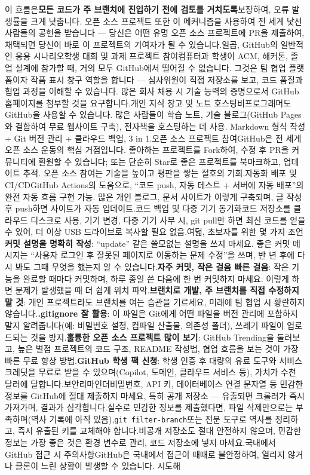 이 흐름은\textbf{모든 코드가 주 브랜치에 진입하기 전에 검토를 거치도록}보장하여, 오류 발생률을 크게 낮춥니다. 오픈 소스 프로젝트 또한 이 메커니즘을 사용하여 전 세계 낯선 사람들의 공헌을 받습니다 — 당신은 어떤 유명 오픈 소스 프로젝트에 PR을 제출하여, 채택되면 당신이 바로 이 프로젝트의 기여자가 될 수 있습니다.일곱, GitHub의 일반적인 응용 시나리오학생 대회 및 과제 프로젝트 참여컴퓨터과 학생이 ACM, 해커톤, 졸업 설계에 참가할 때, 거의 모두 GitHub에서 떨어질 수 없습니다. 그것은 팀 협업 플랫폼이자 작품 표시 창구 역할을 합니다 — 심사위원이 직접 저장소를 보고, 코드 품질과 협업 과정을 이해할 수 있습니다. 많은 회사 채용 시 기술 능력의 증명으로서 GitHub 홈페이지를 첨부할 것을 요구합니다.개인 지식 창고 및 노트 호스팅비프로그래머도 GitHub을 사용할 수 있습니다. 많은 사람들이 학습 노트, 기술 블로그(GitHub Pages와 결합하여 무료 웹사이트 구축), 전자책을 호스팅하는 데 사용. Markdown 형식 작성 + Git 버전 관리 + 클라우드 백업, 3 in 1.오픈 소스 프로젝트 참여GitHub은 전 세계 오픈 소스 운동의 핵심 거점입니다. 좋아하는 프로젝트를 Fork하여, 수정 후 PR을 커뮤니티에 환원할 수 있습니다; 또는 단순히 Star로 좋은 프로젝트를 북마크하고, 업데이트 추적. 오픈 소스 참여는 기술을 높이고 평판을 쌓는 절호의 기회.자동화 배포 및 CI/CDGitHub Actions의 도움으로, “코드 push, 자동 테스트 + 서버에 자동 배포”의 완전 자동 흐름 구현 가능. 많은 개인 블로그, 문서 사이트가 이렇게 구축되며, 글 작성 후 push하면 사이트가 자동 업데이트.코드 백업 및 다중 기기 동기화코드 저장소를 클라우드 디스크로 사용, 기기 변경, 다중 기기 사무 시, git pull만 하면 최신 코드를 얻을 수 있어, 더 이상 USB 드라이브로 복사할 필요 없음.여덟, 초보자를 위한 몇 가지 조언\textbf{커밋 설명을 명확히 작성}: “update” 같은 쓸모없는 설명을 쓰지 마세요. 좋은 커밋 메시지는 “사용자 로그인 후 잘못된 페이지로 이동하는 문제 수정”을 쓰며, 반 년 후에 다시 봐도 그때 무엇을 했는지 알 수 있습니다.\textbf{자주 커밋, 작은 걸음 빠른 걸음}: 작은 기능을 완료할 때마다 커밋하며, 하루 종일 쓴 다음에 한 번 커밋하지 마세요. 이렇게 하면 문제가 발생했을 때 더 쉽게 위치 파악.\textbf{브랜치로 개발, 주 브랜치를 직접 수정하지 말 것}: 개인 프로젝트라도 브랜치를 여는 습관을 기르세요, 미래에 팀 협업 시 황란하지 않습니다.\textbf{.gitignore 잘 활용}: 이 파일은 Git에게 어떤 파일을 버전 관리에 포함하지 말지 알려줍니다(예: 비밀번호 설정, 컴파일 산출물, 의존성 폴더), 쓰레기 파일이 업로드되는 것을 방지.\textbf{훌륭한 오픈 소스 프로젝트 많이 보기}: GitHub Trending을 둘러보고, 높은 별점 프로젝트의 코드 구조, README 작성법, 협업 흐름을 보는 것이 가장 빠른 무료 향상 방법.\textbf{GitHub 학생 팩 신청}: 학생 인증 후 대량의 유료 도구와 서비스 크레딧을 무료로 받을 수 있으며(Copilot, 도메인, 클라우드 서비스 등), 가치가 수천 달러에 달합니다.보안리마인더비밀번호, API 키, 데이터베이스 연결 문자열 등 민감한 정보를 GitHub에 절대 제출하지 마세요, 특히 공개 저장소 — 유출되면 크롤러가 즉시 가져가며, 결과가 심각합니다.실수로 민감한 정보를 제출했다면, 파일 삭제만으로는 부족하며(역사 기록에 아직 있음),\texttt{git filter-\allowbreak branch}또는 전문 도구로 역사를 정리하고, 즉시 유출된 키를 교체해야 합니다.비공개 저장소도 절대 안전하지 않으며, 민감한 정보는 가장 좋은 것은 환경 변수로 관리, 코드 저장소에 넣지 마세요.국내에서 GitHub 접근 시 주의사항GitHub은 국내에서 접근이 때때로 불안정하여, 열리지 않거나 클론이 느린 상황이 발생할 수 있습니다. 시도해 